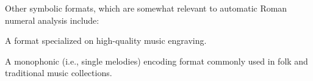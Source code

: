

Other symbolic formats, which are somewhat relevant to automatic Roman numeral analysis include:


A format specialized on high-quality music engraving.


A monophonic (i.e., single melodies) encoding format commonly used in folk and traditional music collections.


